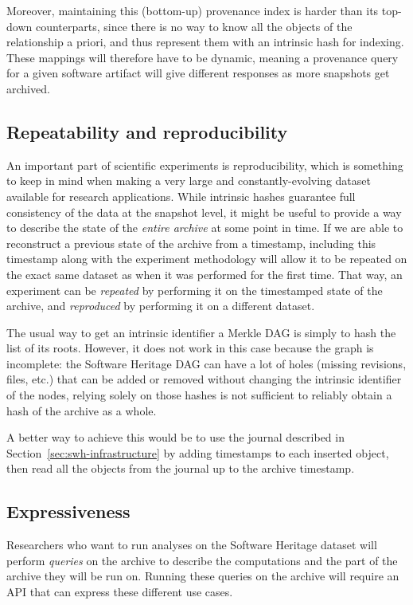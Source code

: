 Moreover, maintaining this (bottom-up) provenance index is harder than its
top-down counterparts, since there is no way to know all the objects of the
relationship a priori, and thus represent them with an intrinsic hash for
indexing. These mappings will therefore have to be dynamic, meaning a
provenance query for a given software artifact will give different responses as
more snapshots get archived.

\subsection{Repeatability and reproducibility}

An important part of scientific experiments is reproducibility, which is
something to keep in mind when making a very large and
constantly-evolving dataset available for research applications. While
intrinsic hashes guarantee full consistency of the data at the snapshot level,
it might be useful to provide a way to describe the state of the \emph{entire
  archive} at some point in time. If we are able to reconstruct a previous
state of the archive from a timestamp, including this timestamp along
with the experiment methodology will allow it to be repeated on the exact same
dataset as when it was performed for the first time. That way, an experiment
can be \emph{repeated} by performing it on the timestamped state of the
archive, and \emph{reproduced} by performing it on a different dataset.

The usual way to get an intrinsic identifier a Merkle DAG is simply to hash the
list of its roots. However, it does not work in this case because the graph is
incomplete: the Software Heritage DAG can have a lot of holes (missing
revisions, files, etc.) that can be added or removed without changing the
intrinsic identifier of the nodes, relying solely on those hashes is not
sufficient to reliably obtain a hash of the archive as a whole.

A better way to achieve this would be to use the journal described in
Section~\ref{sec:swh-infrastructure} by adding timestamps to each inserted
object, then read all the objects from the journal up to the archive timestamp.

\subsection{Expressiveness}

Researchers who want to run analyses on the Software Heritage dataset will
perform \emph{queries} on the archive to describe the computations and the part
of the archive they will be run on. Running these queries on the archive will
require an API that can express these different use cases.

